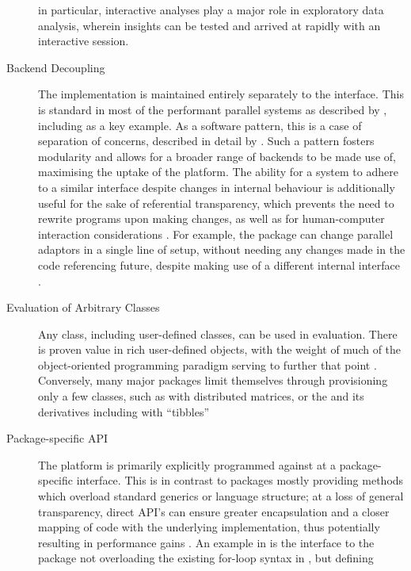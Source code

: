 \begin{description}
    in particular, interactive analyses play a major role in exploratory
    data analysis, wherein insights can be tested and arrived at rapidly
    with an interactive session.
  \item[Backend Decoupling]
    The implementation is maintained entirely separately to the interface.
    This is standard in most of the performant parallel \R systems as
    described by \textcite{eddelbuettel2019parallel}, including  as a key
    example\cite{microsoft20}. As a software pattern, this is a case of
    separation of concerns, described in detail by \textcite{dijkstra1982role}.
    Such a pattern fosters modularity and allows for a broader range of
    backends to be made use of, maximising the uptake of the platform. The
    ability for a system to adhere to a similar interface despite changes in
    internal behaviour is additionally useful for the sake of referential
    transparency, which prevents the need to rewrite programs upon making
    changes, as well as for human-computer interaction considerations
    \cites{sondergaard1990Rtda,norman2013design}. For example, the 
    package can change parallel adaptors in a single line of setup, without
    needing any changes made in the code referencing future, despite making
    use of a different internal interface \cite{weston19:_using}.
  \item[Evaluation of Arbitrary Classes]
    Any class, including user-defined classes, can be used in evaluation.
    There is proven value in rich user-defined objects, with the weight of
    much of the object-oriented programming paradigm serving to further that
    point \cite{dahl2004simula}. Conversely, many major packages limit
    themselves through provisioning only a few classes, such as  with
    distributed matrices, or the  and its derivatives including
     with ``tibbles'' \cites{pbdDMATpackage,wickham2019welcome}
  \item[Package-specific API]
    The platform is primarily explicitly programmed against at a
    package-specific interface. This is in contrast to packages mostly
    providing methods which overload standard generics or language
    structure; at a loss of general transparency, direct API's can ensure
    greater encapsulation and a closer mapping of code with the underlying
    implementation, thus potentially resulting in performance gains
    \cite{bierhoff2009api}. An example in \R is the interface to the 
    package not overloading the existing for-loop syntax in \R, but defining

\end{description}

